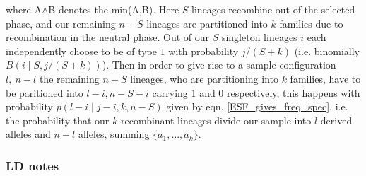 \documentclass[a4paper,10pt]{article}
\begin{document}
where A$\wedge$B denotes the min(A,B). Here $S$ lineages recombine out of the selected phase, and our remaining $n-S$ lineages are partitioned into $k$ families due to recombination in the neutral phase. Out of our $S$ singleton lineages $i$ each independently choose to be of type $1$ with probability $j/(S+k)$ (i.e. binomially $ B(i \mid S,j/(S+k))$). Then in order to give rise to a sample configuration $l,~n-l$ the remaining $n-S$ lineages, who are partitioning into $k$ families, have to be paritioned into $l-i,n-S-i$ carrying 1 and 0 respectively, this happens with probability $p(l-i \mid j-i,k,n-S )$ given by eqn. \eqref{ESF_gives_freq_spec}.
i.e. the probability that our $k$ recombinant lineages divide our sample into $l$ derived alleles and $n-l$ alleles, summing  $\{a_1,\dots,a_k\}$. 

\subsubsection{LD notes}






\end{document}
